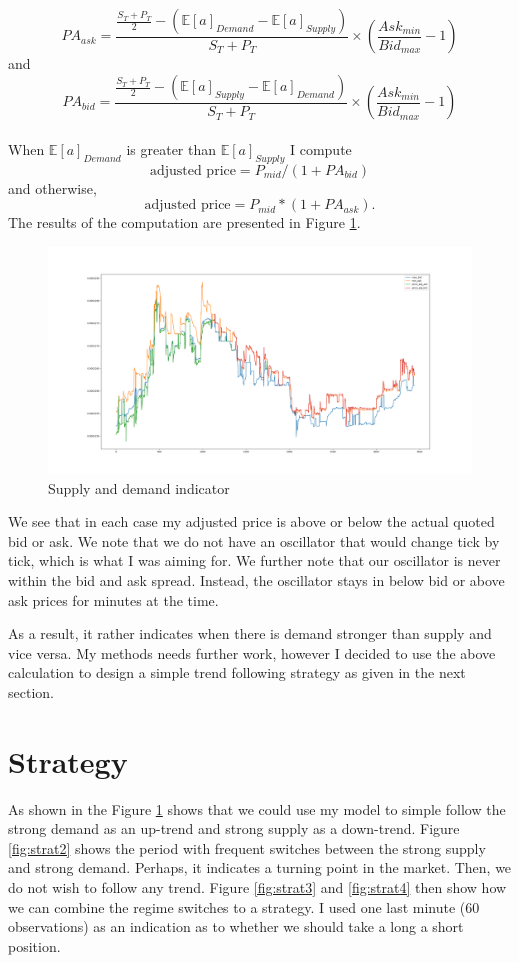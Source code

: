 \documentclass[12pt]{article}
\begin{document}
\[
	PA_{ask} = \frac{\frac{S_T + P_T}{2} - (\mathbb{E}[a]_{Demand} - \mathbb{E}[a]_{Supply})}{S_T + P_T} \times \left(\frac{Ask_{min}}{Bid_{max}} - 1 \right)
\]
and
\[
	PA_{bid} = \frac{\frac{S_T + P_T}{2} - (\mathbb{E}[a]_{Supply} -\mathbb{E}[a]_{Demand} )}{S_T + P_T} \times \left(\frac{Ask_{min}}{Bid_{max}} - 1 \right)
\]
\\
When $\mathbb{E}[a]_{Demand}$ is greater than $\mathbb{E}[a]_{Supply}$ I compute 
\[
  \text{adjusted price} = P_{mid} / (1 + PA_{bid})
\]
and otherwise,
\[
  \text{adjusted price} = P_{mid} * (1 + PA_{ask}) .
\]
The results of the computation are presented in Figure \ref{fig:strat1}.
\begin{figure}[h!]
	\centering
  \includegraphics[width=\textwidth]{strategy1.png}
  \caption{Supply and demand indicator}
  \label{fig:strat1}
\end{figure}
We see that in each case my adjusted price is above or below the actual quoted bid or ask. We note that we do not have an oscillator that would change tick by tick, which is what I was aiming for. We further note that our oscillator is never within the bid and ask spread. Instead, the oscillator  stays in below bid or above ask prices for minutes at the time.

As a result, it rather indicates when there is demand stronger than supply and vice versa. My methods needs further work, however I decided to use the above calculation to design a simple trend following strategy as given in the next section.

\section*{Strategy}
As shown in the Figure \ref{fig:strat1} shows that we could use my model to simple follow the strong demand as an up-trend and strong supply as a down-trend. Figure \ref{fig:strat2} shows the period with frequent switches between the strong supply and strong demand. Perhaps, it indicates a turning point in the market. Then, we do not wish to follow any trend.
Figure \ref{fig:strat3} and \ref{fig:strat4} then show how we can combine the regime switches to a strategy. I used one last minute (60 observations) as an indication as to whether we should take a long a short position.
\end{document}
